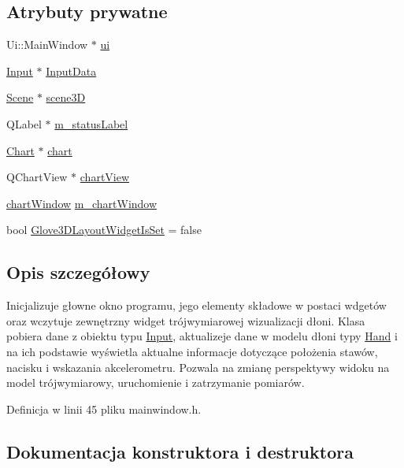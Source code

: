 \subsection*{Atrybuty prywatne}
\begin{DoxyCompactItemize}
\item 
Ui\+::\+Main\+Window $\ast$ \hyperlink{class_main_window_a35466a70ed47252a0191168126a352a5}{ui}
\item 
\hyperlink{class_input}{Input} $\ast$ \hyperlink{class_main_window_aa4484150b90e4d13bb42316d12c34650}{Input\+Data}
\item 
\hyperlink{class_scene}{Scene} $\ast$ \hyperlink{class_main_window_a3c6e8f3b032c72151f1e871e26d33fcb}{scene3D}
\item 
Q\+Label $\ast$ \hyperlink{class_main_window_ab9c6492b81f3117ca8fed55c7b97da44}{m\+\_\+status\+Label}
\item 
\hyperlink{class_chart}{Chart} $\ast$ \hyperlink{class_main_window_a49e608ed992fde7d85b3acc3ddbba6c2}{chart}
\item 
Q\+Chart\+View $\ast$ \hyperlink{class_main_window_a65fb64a7b9a722f77bfc022a9f4b5e8b}{chart\+View}
\item 
\hyperlink{classchart_window}{chart\+Window} \hyperlink{class_main_window_a9743425e4ce7d961c6b1a7c81a6e4da2}{m\+\_\+chart\+Window}
\item 
bool \hyperlink{class_main_window_a75523a2f7099a2101e18e0f5356934a9}{Glove3\+D\+Layout\+Widget\+Is\+Set} = false
\end{DoxyCompactItemize}


\subsection{Opis szczegółowy}
Inicjalizuje głowne okno programu, jego elementy składowe w postaci wdgetów oraz wczytuje zewnętrzny widget trójwymiarowej wizualizacji dłoni. Klasa pobiera dane z obiektu typu \hyperlink{class_input}{Input}, aktualizeje dane w modelu dłoni typy \hyperlink{class_hand}{Hand} i na ich podstawie wyświetla aktualne informacje dotyczące położenia stawów, nacisku i wskazania akcelerometru. Pozwala na zmianę perspektywy widoku na model trójwymiarowy, uruchomienie i zatrzymanie pomiarów. 

Definicja w linii 45 pliku mainwindow.\+h.



\subsection{Dokumentacja konstruktora i destruktora}
\mbox{\label{class_main_window_a8b244be8b7b7db1b08de2a2acb9409db}} 
